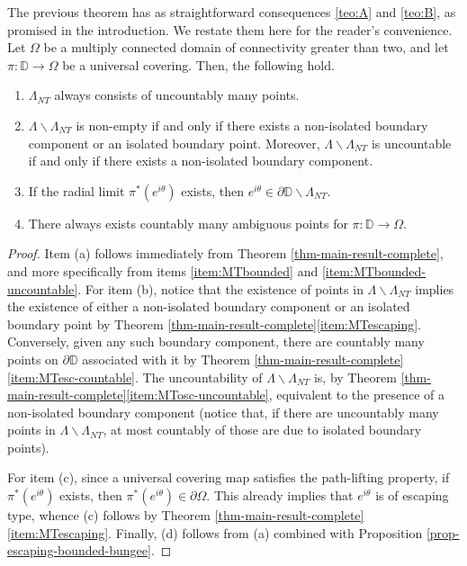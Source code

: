 \documentclass[11pt,a4paper,reqno]{amsart}
\makeatletter
\theoremstyle{plain}
\theoremstyle{definition}
\theoremstyle{plain}
\newcounter{namedthm}
\newenvironment{named}[1]
{\def\namedthmname{#1}%
	\refstepcounter{namedthm}%
	\namedthm\def\@currentlabel{#1}}
{\endnamedthm}
\def\DD{\mathbb{D}}
\def\dD{\partial\mathbb{D}}
\renewcommand{\setminus}{\smallsetminus}
\makeatother
\begin{document}
The previous theorem
 has as straightforward consequences \ref{teo:A} and \ref{teo:B}, as promised in the introduction. We restate  them here for the reader's convenience.
\begin{named}{Theorem A}
		Let $ \Omega $ be a multiply connected domain of connectivity greater than two, and let $ \pi\colon \mathbb{D}\to\Omega $ be a universal covering. Then, the following hold.
	\begin{enumerate}[label={\normalfont (\alph*)}]
			\item $ \Lambda_{NT} $ always consists of uncountably many points.
			\item $ \Lambda\smallsetminus \Lambda_{NT} $ is non-empty if and only if there exists a non-isolated boundary component or an isolated boundary point. Moreover, $ \Lambda\smallsetminus \Lambda_{NT} $ is uncountable if and only if there exists a non-isolated boundary component.
			\item If the radial limit  $ \pi^*(e^{i\theta}) $ exists, then $ e^{i\theta}\in\partial\DD\setminus\Lambda_{NT}$.
			\item There always exists countably many ambiguous points for $ \pi\colon \mathbb{D}\to\Omega $.
		\end{enumerate}
\end{named}
\begin{proof} Item (a) follows immediately from Theorem \ref{thm-main-result-complete}, and more specifically from items \ref{item:MTbounded} and \ref{item:MTbounded-uncountable}. For item (b), notice that the existence of points in $\Lambda\setminus\Lambda_{NT}$ implies the existence of either a non-isolated boundary component or an isolated boundary point by Theorem \ref{thm-main-result-complete}\ref{item:MTescaping}. Conversely, given any such boundary component, there are countably many points on $\dD$ associated with it by Theorem \ref{thm-main-result-complete}\ref{item:MTesc-countable}. The uncountability of $\Lambda\setminus\Lambda_{NT}$ is, by Theorem \ref{thm-main-result-complete}\ref{item:MTosc-uncountable}, equivalent to the presence of a non-isolated boundary component (notice that, if there are uncountably many points in $\Lambda\setminus\Lambda_{NT}$, at most countably of those are due to isolated boundary points).

For item (c), since a universal covering map satisfies the path-lifting property, if $ \pi^*(e^{i\theta}) $ exists, then $ \pi^*(e^{i\theta}) \in\partial\Omega$. This already implies that $ e^{i\theta} $ is of escaping type, whence (c) follows by Theorem \ref{thm-main-result-complete}\ref{item:MTescaping}. Finally, (d) follows from (a) combined with Proposition \ref{prop-escaping-bounded-bungee}.
\end{proof}
\end{document}
